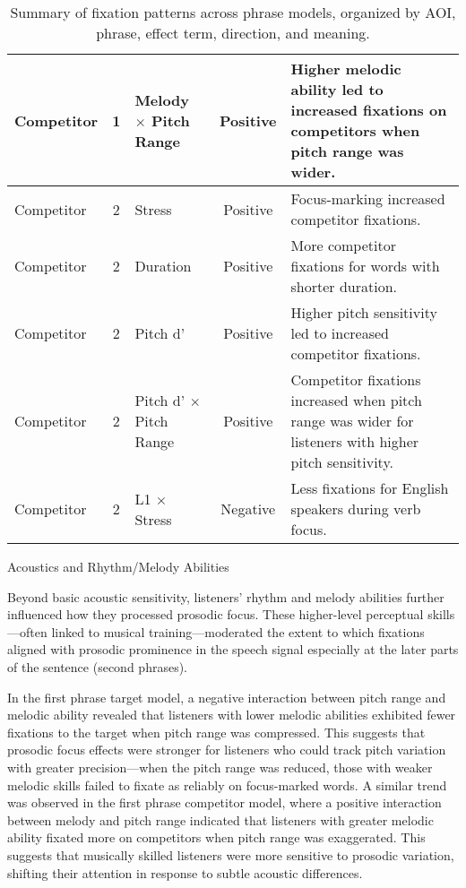 \begin{table}[h]
{\begin{tabular}{|l|c|l|c|l|}
        Competitor & 1 & Melody $\times$ Pitch Range & Positive & Higher melodic ability led to increased fixations on competitors when pitch range was wider. \\
        \hline
        Competitor & 2 & Stress & Positive & Focus-marking increased competitor fixations. \\
        Competitor & 2 & Duration & Positive & More competitor fixations for words with shorter duration. \\
        Competitor & 2 & Pitch d' & Positive & Higher pitch sensitivity led to increased competitor fixations. \\
        Competitor & 2 & Pitch d' $\times$ Pitch Range & Positive & Competitor fixations increased when pitch range was wider for listeners with higher pitch sensitivity. \\
        Competitor & 2 & L1 $\times$ Stress & Negative & Less fixations for English speakers during verb focus. \\
        \hline
    \end{tabular}
    }
    \caption{Summary of fixation patterns across phrase models, organized by AOI, phrase, effect term, direction, and meaning.}
    \label{tab:fixation_patterns}
\end{table}

Acoustics and Rhythm/Melody Abilities

Beyond basic acoustic sensitivity, listeners’ rhythm and melody abilities further influenced how they processed prosodic focus. These higher-level perceptual skills—often linked to musical training—moderated the extent to which fixations aligned with prosodic prominence in the speech signal especially at the later parts of the sentence (second phrases).

In the first phrase target model, a negative interaction between pitch range and melodic ability revealed that listeners with lower melodic abilities exhibited fewer fixations to the target when pitch range was compressed. This suggests that prosodic focus effects were stronger for listeners who could track pitch variation with greater precision—when the pitch range was reduced, those with weaker melodic skills failed to fixate as reliably on focus-marked words. A similar trend was observed in the first phrase competitor model, where a positive interaction between melody and pitch range indicated that listeners with greater melodic ability fixated more on competitors when pitch range was exaggerated. This suggests that musically skilled listeners were more sensitive to prosodic variation, shifting their attention in response to subtle acoustic differences.

